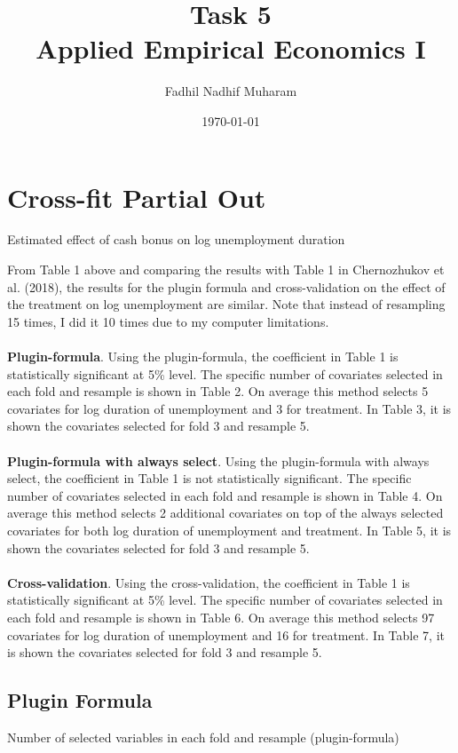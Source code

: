 \documentclass[10pt,leqno]{article}
\title{Task 5\\
Applied Empirical Economics I}
\author{Fadhil Nadhif Muharam}
\date{\today}
\begin{document}
\maketitle

\section{Cross-fit Partial Out}

\begin{table}[H]
\centering
\caption{Estimated effect of cash bonus on log unemployment duration}

\end{table}

From Table 1 above and comparing the results with Table 1 in Chernozhukov et al. (2018), the results for the plugin formula and cross-validation on the effect of the treatment on log unemployment are similar. Note that instead of resampling 15 times, I did it 10 times due to my computer limitations. 
\\
\\
\textbf{Plugin-formula}. Using the plugin-formula, the coefficient in Table 1 is statistically significant at 5\% level. The specific number of covariates selected in each fold and resample is shown in Table 2. On average this method selects 5 covariates for log duration of unemployment and 3 for treatment. In Table 3, it is shown the covariates selected for fold 3 and resample 5.
\\
\\
\textbf{Plugin-formula with always select}. Using the plugin-formula with always select, the coefficient in Table 1 is not statistically significant. The specific number of covariates selected in each fold and resample is shown in Table 4. On average this method selects 2 additional covariates on top of the always selected covariates for both log duration of unemployment and treatment. In Table 5, it is shown the covariates selected for fold 3 and resample 5.
\\
\\
\textbf{Cross-validation}. Using the cross-validation, the coefficient in Table 1 is statistically significant at 5\% level. The specific number of covariates selected in each fold and resample is shown in Table 6. On average this method selects 97 covariates for log duration of unemployment and 16 for treatment. In Table 7, it is shown the covariates selected for fold 3 and resample 5.
\\
\pagebreak
\subsection{Plugin Formula}
\begin{table}[H]
  \centering
  \caption{Number of selected variables in each fold and resample (plugin-formula)}
  \label{tab:1}
  \resizebox{0.35\textwidth}{!}{
    }
\end{table}%
\end{document}
